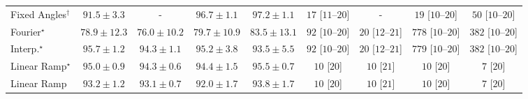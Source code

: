 \begin{tabular}{l|cccc|cccc|}
Fixed Angles$^\dagger$ & {\cellcolor[HTML]{045D92}} \color[HTML]{F1F1F1} $91.5\pm 3.3$ & {\cellcolor[HTML]{000000}} \color[HTML]{F1F1F1} {\cellcolor{white}} \color{black} - & {\cellcolor[HTML]{023F64}} \color[HTML]{F1F1F1} $96.7\pm 1.1$ & {\cellcolor[HTML]{023C5F}} \color[HTML]{F1F1F1} $97.2\pm 1.1$ & {\cellcolor[HTML]{FFF5F1}} \color[HTML]{000000} $17$ [$11$--$20$] & {\cellcolor[HTML]{000000}} \color[HTML]{F1F1F1} {\cellcolor{white}} \color{black} - & {\cellcolor[HTML]{FFF5F1}} \color[HTML]{000000} $19$ [$10$--$20$] & {\cellcolor[HTML]{FEEDE9}} \color[HTML]{000000} $50$ [$10$--$20$] \\
Fourier$^\star$ & {\cellcolor[HTML]{4A98C5}} \color[HTML]{F1F1F1} $78.9\pm 12.3$ & {\cellcolor[HTML]{69A5CC}} \color[HTML]{F1F1F1} $76.0\pm 10.2$ & {\cellcolor[HTML]{4094C3}} \color[HTML]{F1F1F1} $79.7\pm 10.9$ & {\cellcolor[HTML]{1E80B8}} \color[HTML]{F1F1F1} $83.5\pm 13.1$ & {\cellcolor[HTML]{FDE3E0}} \color[HTML]{000000} $92$ [$10$--$20$] & {\cellcolor[HTML]{FFF4F0}} \color[HTML]{000000} $20$ [$12$--$21$] & {\cellcolor[HTML]{49006A}} \color[HTML]{F1F1F1} $778$ [$10$--$20$] & {\cellcolor[HTML]{F76EA3}} \color[HTML]{F1F1F1} $382$ [$10$--$20$] \\
Interp.$^\star$ & {\cellcolor[HTML]{03456C}} \color[HTML]{F1F1F1} $95.7\pm 1.2$ & {\cellcolor[HTML]{034D79}} \color[HTML]{F1F1F1} $94.3\pm 1.1$ & {\cellcolor[HTML]{034871}} \color[HTML]{F1F1F1} $95.2\pm 3.8$ & {\cellcolor[HTML]{045280}} \color[HTML]{F1F1F1} $93.5\pm 5.5$ & {\cellcolor[HTML]{FDE3E0}} \color[HTML]{000000} $92$ [$10$--$20$] & {\cellcolor[HTML]{FFF4F0}} \color[HTML]{000000} $20$ [$12$--$21$] & {\cellcolor[HTML]{49006A}} \color[HTML]{F1F1F1} $779$ [$10$--$20$] & {\cellcolor[HTML]{F76EA3}} \color[HTML]{F1F1F1} $382$ [$10$--$20$] \\
Linear Ramp$^\star$ & {\cellcolor[HTML]{034973}} \color[HTML]{F1F1F1} $95.0\pm 0.9$ & {\cellcolor[HTML]{034D79}} \color[HTML]{F1F1F1} $94.3\pm 0.6$ & {\cellcolor[HTML]{034C78}} \color[HTML]{F1F1F1} $94.4\pm 1.5$ & {\cellcolor[HTML]{03466E}} \color[HTML]{F1F1F1} $95.5\pm 0.7$ & {\cellcolor[HTML]{FFF7F3}} \color[HTML]{000000} $10$ [$20$] & {\cellcolor[HTML]{FFF7F3}} \color[HTML]{000000} $10$ [$21$] & {\cellcolor[HTML]{FFF7F3}} \color[HTML]{000000} $10$ [$20$] & {\cellcolor[HTML]{FFF7F3}} \color[HTML]{000000} $7$ [$20$] \\
Linear Ramp & {\cellcolor[HTML]{045483}} \color[HTML]{F1F1F1} $93.2\pm 1.2$ & {\cellcolor[HTML]{045585}} \color[HTML]{F1F1F1} $93.1\pm 0.7$ & {\cellcolor[HTML]{045B8E}} \color[HTML]{F1F1F1} $92.0\pm 1.7$ & {\cellcolor[HTML]{03517E}} \color[HTML]{F1F1F1} $93.8\pm 1.7$ & {\cellcolor[HTML]{FFF7F3}} \color[HTML]{000000} $10$ [$20$] & {\cellcolor[HTML]{FFF7F3}} \color[HTML]{000000} $10$ [$21$] & {\cellcolor[HTML]{FFF7F3}} \color[HTML]{000000} $10$ [$20$] & {\cellcolor[HTML]{FFF7F3}} \color[HTML]{000000} $7$ [$20$] \\

\end{tabular}
